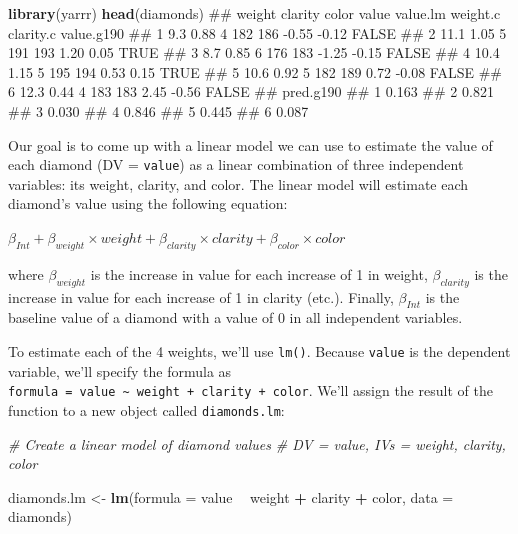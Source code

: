 \documentclass[]{book}
\newenvironment{Shaded}{\begin{snugshade}}{\end{snugshade}}
\newcommand{\KeywordTok}[1]{\textcolor[rgb]{0.13,0.29,0.53}{\textbf{#1}}}
\newcommand{\DataTypeTok}[1]{\textcolor[rgb]{0.13,0.29,0.53}{#1}}
\newcommand{\StringTok}[1]{\textcolor[rgb]{0.31,0.60,0.02}{#1}}
\newcommand{\CommentTok}[1]{\textcolor[rgb]{0.56,0.35,0.01}{\textit{#1}}}
\newcommand{\OperatorTok}[1]{\textcolor[rgb]{0.81,0.36,0.00}{\textbf{#1}}}
\newcommand{\NormalTok}[1]{#1}
\theoremstyle{definition}
\theoremstyle{definition}
\theoremstyle{remark}
\begin{document}
\begin{Shaded}
\begin{Highlighting}[]
\KeywordTok{library}\NormalTok{(yarrr)}
\KeywordTok{head}\NormalTok{(diamonds)}
\NormalTok{##   weight clarity color value value.lm weight.c clarity.c value.g190}
\NormalTok{## 1    9.3    0.88     4   182      186    -0.55     -0.12      FALSE}
\NormalTok{## 2   11.1    1.05     5   191      193     1.20      0.05       TRUE}
\NormalTok{## 3    8.7    0.85     6   176      183    -1.25     -0.15      FALSE}
\NormalTok{## 4   10.4    1.15     5   195      194     0.53      0.15       TRUE}
\NormalTok{## 5   10.6    0.92     5   182      189     0.72     -0.08      FALSE}
\NormalTok{## 6   12.3    0.44     4   183      183     2.45     -0.56      FALSE}
\NormalTok{##   pred.g190}
\NormalTok{## 1     0.163}
\NormalTok{## 2     0.821}
\NormalTok{## 3     0.030}
\NormalTok{## 4     0.846}
\NormalTok{## 5     0.445}
\NormalTok{## 6     0.087}
\end{Highlighting}
\end{Shaded}

Our goal is to come up with a linear model we can use to estimate the
value of each diamond (DV = \texttt{value}) as a linear combination of
three independent variables: its weight, clarity, and color. The linear
model will estimate each diamond's value using the following equation:

\(\beta_{Int} + \beta_{weight} \times weight + \beta_{clarity} \times clarity + \beta_{color} \times color\)

where \(\beta_{weight}\) is the increase in value for each increase of 1
in weight, \(\beta_{clarity}\) is the increase in value for each
increase of 1 in clarity (etc.). Finally, \(\beta_{Int}\) is the
baseline value of a diamond with a value of 0 in all independent
variables.

To estimate each of the 4 weights, we'll use \texttt{lm()}. Because
\texttt{value} is the dependent variable, we'll specify the formula as
\texttt{formula\ =\ value\ \textasciitilde{}\ weight\ +\ clarity\ +\ color}.
We'll assign the result of the function to a new object called
\texttt{diamonds.lm}:

\begin{Shaded}
\begin{Highlighting}[]
\CommentTok{# Create a linear model of diamond values}
\CommentTok{#   DV = value, IVs = weight, clarity, color}

\NormalTok{diamonds.lm <-}\StringTok{ }\KeywordTok{lm}\NormalTok{(}\DataTypeTok{formula =}\NormalTok{ value }\OperatorTok{~}\StringTok{ }\NormalTok{weight }\OperatorTok{+}\StringTok{ }\NormalTok{clarity }\OperatorTok{+}\StringTok{ }\NormalTok{color,}
                  \DataTypeTok{data =}\NormalTok{ diamonds)}
\end{Highlighting}
\end{Shaded}
\end{document}
